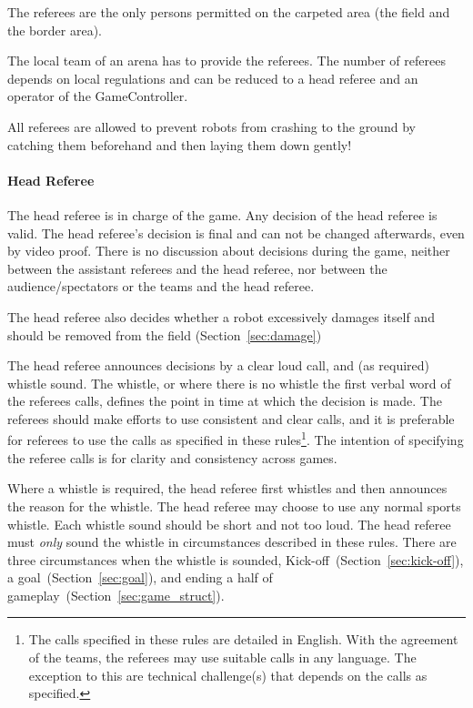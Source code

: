 The referees are the only persons permitted on the carpeted area (\ie the field and the border area).

The local team of an arena has to provide the referees. The number of referees depends on local regulations and can be reduced to a head referee and an operator of the GameController.

All referees are allowed to prevent robots from crashing to the ground by catching them beforehand and then laying them down gently!

\paragraph{Head Referee}
\label{sec:head_referee}

The head referee is in charge of the game. Any decision of the head referee is valid. The head referee's decision is final and can not be changed afterwards, even by video proof. There is no discussion about decisions during the game, neither between the assistant referees and the head referee, nor between the audience/spectators or the teams and the head referee.

The head referee also decides whether a robot excessively damages itself and should be removed from the field (\cf Section~\ref{sec:damage})

The head referee announces decisions by a clear loud call, and (as required) whistle sound.
The whistle, or where there is no whistle the first verbal word of the referees calls, defines the point in time at which the decision is made.
The referees should make efforts to use consistent and clear calls, and it is preferable for referees to use the calls as specified in these rules\footnote{The calls specified in these rules are detailed in English. With the agreement of the teams, the referees may use suitable calls in any language. The exception to this are technical challenge(s) that depends on the calls as specified.}.
The intention of specifying the referee calls is for clarity and consistency across games.

Where a whistle is required, the head referee first whistles and then announces the reason for the whistle.
The head referee may choose to use any normal sports whistle.
Each whistle sound should be short and not too loud.
The head referee must \textit{only} sound the whistle in circumstances described in these rules.
There are three circumstances when the whistle is sounded, Kick-off~(\cf Section~\ref{sec:kick-off}), a goal~(\cf Section~\ref{sec:goal}), and ending a half of gameplay~(\cf Section~\ref{sec:game_struct}).

